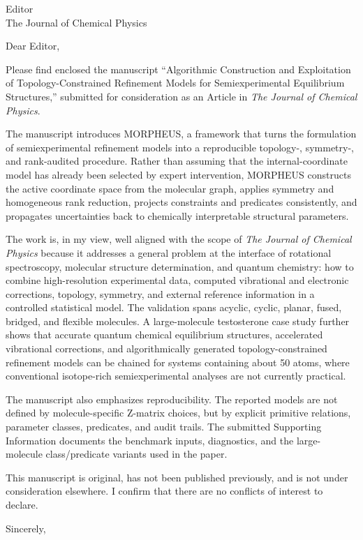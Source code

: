 \documentclass[11pt]{letter}
\begin{document}
\begin{letter}{Editor\\
The Journal of Chemical Physics}

\opening{Dear Editor,}

Please find enclosed the manuscript ``Algorithmic Construction and Exploitation
of Topology-Constrained Refinement Models for Semiexperimental Equilibrium
Structures,'' submitted for consideration as an Article in \emph{The Journal of
Chemical Physics}.

The manuscript introduces MORPHEUS, a framework that turns the formulation of
semiexperimental refinement models into a reproducible topology-, symmetry-,
and rank-audited procedure. Rather than assuming that the internal-coordinate
model has already been selected by expert intervention, MORPHEUS constructs the
active coordinate space from the molecular graph, applies symmetry and
homogeneous rank reduction, projects constraints and predicates consistently,
and propagates uncertainties back to chemically interpretable structural
parameters.

The work is, in my view, well aligned with the scope of \emph{The Journal of
Chemical Physics} because it addresses a general problem at the interface of
rotational spectroscopy, molecular structure determination, and quantum
chemistry: how to combine high-resolution experimental data, computed
vibrational and electronic corrections, topology, symmetry, and external
reference information in a controlled statistical model. The validation spans
acyclic, cyclic, planar, fused, bridged, and flexible molecules. A
large-molecule testosterone case study further shows that accurate quantum
chemical equilibrium structures, accelerated vibrational corrections, and
algorithmically generated topology-constrained refinement models can be chained
for systems containing about 50 atoms, where conventional isotope-rich
semiexperimental analyses are not currently practical.

The manuscript also emphasizes reproducibility. The reported models are not
defined by molecule-specific Z-matrix choices, but by explicit primitive
relations, parameter classes, predicates, and audit trails. The submitted
Supporting Information documents the benchmark inputs, diagnostics, and the
large-molecule class/predicate variants used in the paper.

This manuscript is original, has not been published previously, and is not
under consideration elsewhere. I confirm that there are no conflicts of
interest to declare.

\closing{Sincerely,}

\end{letter}
\end{document}
